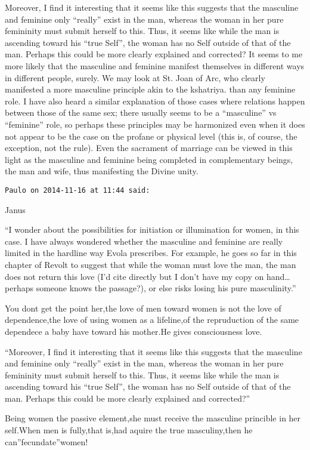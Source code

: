 \begin{footnotesize}
\begin{sffamily}
Moreover, I find it interesting that it seems like this suggests that the masculine and feminine only “really” exist in the man, whereas the woman in her pure femininity must submit herself to this. Thus, it seems like while the man is ascending toward his “true Self”, the woman has no Self outside of that of the man. Perhaps this could be more clearly explained and corrected? It seems to me more likely that the masculine and feminine manifest themselves in different ways in different people, surely. We may look at St. Joan of Arc, who clearly manifested a more masculine principle akin to the kshatriya. than any feminine role. I have also heard a similar explanation of those cases where relations happen between those of the same sex; there usually seems to be a “masculine” vs “feminine” role, so perhaps these principles may be harmonized even when it does not appear to be the case on the profane or physical level (this is, of course, the exception, not the rule). Even the sacrament of marriage can be viewed in this light as the masculine and feminine being completed in complementary beings, the man and wife, thus manifesting the Divine unity.


\hfill

\texttt{Paulo on 2014-11-16 at 11:44 said: }

Janus

“I wonder about the possibilities for initiation or illumination for women, in this case. I have always wondered whether the masculine and feminine are really limited in the hardline way Evola prescribes. For example, he goes so far in this chapter of Revolt to suggest that while the woman must love the man, the man does not return this love (I'd cite directly but I don't have my copy on hand…perhaps someone knows the passage?), or else risks losing his pure masculinity.” 

You dont get the point her,the love of men toward women is not the love of dependence,the love of using women as a lifeline,of the repruduction of the same dependece a baby have toward his mother.He gives consciousness love.

“Moreover, I find it interesting that it seems like this suggests that the masculine and feminine only “really” exist in the man, whereas the woman in her pure femininity must submit herself to this. Thus, it seems like while the man is ascending toward his “true Self”, the woman has no Self outside of that of the man. Perhaps this could be more clearly explained and corrected?”

Being women the passive element,she must receive the masculine princible in her self.When men is fully,that is,had aquire the true masculiny,then he can”fecundate”women!


\end{sffamily}
\end{footnotesize}
